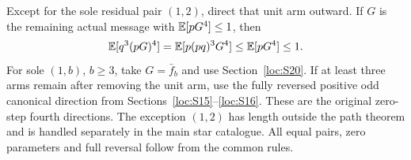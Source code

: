 Except for the sole residual pair $(1,2)$, direct that unit arm outward.
If $G$ is the remaining actual message with $\mathbb E[pG^4]\le1$, then
\[
 \mathbb E[q^3(pG)^4]=\mathbb E[p(pq)^3G^4]\le\mathbb E[pG^4]\le1.
\]
For sole $(1,b)$, $b\ge3$, take $G=\bar f_{b}$ and use
Section~\ref{loc:S20}. If at least three arms remain after removing the
unit arm, use the fully reversed positive odd canonical direction
from Sections~\ref{loc:S15}--\ref{loc:S16}.
These are the original zero-step fourth directions.
The exception $(1,2)$ has length outside the path theorem and is handled
separately in the main star catalogue.
All equal pairs, zero parameters and full reversal follow from the common rules.
